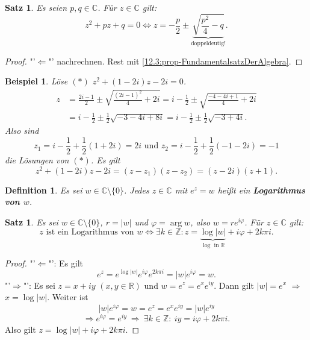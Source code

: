 \documentclass[12pt]{extreport} %
\newcommand{\C}{\mathbb{C}}
\newcommand{\R}{\mathbb{R}}
\newcommand{\Z}{\mathbb{Z}}
\theoremstyle{named}
\theoremstyle{itshape}
\newtheorem{satz}[unnamedtheorem]{Satz}
\newtheorem*{definition}{Definition}
\theoremstyle{normal}
\newtheorem{beispiel}[unnamedtheorem]{Beispiel}
\begin{document}
{\begin{satz} \label{12.5:satz}
	Es seien $p, q \in \C$. Für $z \in \C$ gilt:
	$$ z^{2} + pz + q = 0 \iff z = -\frac{p}{2} \pm \underbrace{\sqrt{\frac{p^{2}}{4} - q}}_{\text{doppeldeutig!}}. $$	
\end{satz}

\begin{proof}
	"'$\Leftarrow$"' nachrechnen. Rest mit \ref{12.3:prop-FundamentalsatzDerAlgebra}.
\end{proof}


\begin{beispiel}
	Löse $(*)$ $z^{2} + (1 - 2i)z - 2i = 0$. 
	\begin{align*}
		z & = \frac{2i - 1}{2} \pm \sqrt{ \frac{(2i - 1)^{2}}{4} + 2i} = i - \frac{1}{2} \pm \sqrt{\frac{-4 - 4i + 1}{4} + 2i} \\
		  & = i - \frac{1}{2} \pm \frac{1}{2}\sqrt{ -3 - 4i + 8i}  = i - \frac{1}{2} \pm \frac{1}{2} \sqrt{-3 + 4i}.
	\end{align*}
	Also sind 
	$$
		z_{1}  = i - \frac{1}{2} + \frac{1}{2} (1 + 2i) = 2i \text{ und }
		z_{2}  = i - \frac{1}{2} + \frac{1}{2} (-1 - 2i) = -1 
	$$
	die Lösungen von $(*)$. Es gilt $$z^{2} + (1 - 2i) z - 2i = ( z - z_{1})(z - z_{2}) = (z - 2i) (z + 1).$$
\end{beispiel}

\begin{definition}
	Es sei $w \in \C \setminus \{ 0 \}$. Jedes $z \in \C$ mit $e^{z} = w$ hei{\ss}t ein \textbf{Logarithmus von $w$}.
\end{definition}


\begin{satz} \label{12.6:satz}
	Es sei $w \in \C \setminus \{ 0 \}$, $ r = |w|$ und $\varphi = \arg w$, also $w = r e^{i \varphi}$. Für $z \in \C$ gilt: 
	$$ z \text{ ist ein Logarithmus von } w \iff \exists k \in \Z: z = \underbrace{\log |w|}_{\log \text{ in } \R} + i \varphi + 2 k \pi i. $$	
\end{satz}

\begin{proof}
	"'$\Leftarrow$"': Es gilt $$e^{z} = e^{\log |w|} e^{i \varphi} e^{2 k \pi i} = |w| e^{i \varphi} = w.$$
	"'$\Rightarrow$"': Es sei $z = x + iy$ $(x, y \in \R)$ und $w = e^{z} = e^{x} e^{iy}$. Dann gilt $|w| = e^{x}$ $\Rightarrow$ $x = \log |w|$. Weiter ist
	$$ |w| e^{i \varphi} = w = e^{z} = e^{x} e^{iy} = |w| e^{iy} $$
	$$ \Rightarrow e^{i \varphi} = e^{iy} ~ \Rightarrow ~ \exists k \in \Z: ~ i y = i \varphi + 2k \pi i.$$
	Also gilt $z = \log |w| + i \varphi + 2k \pi i$.
\end{proof}


}
\end{document}
